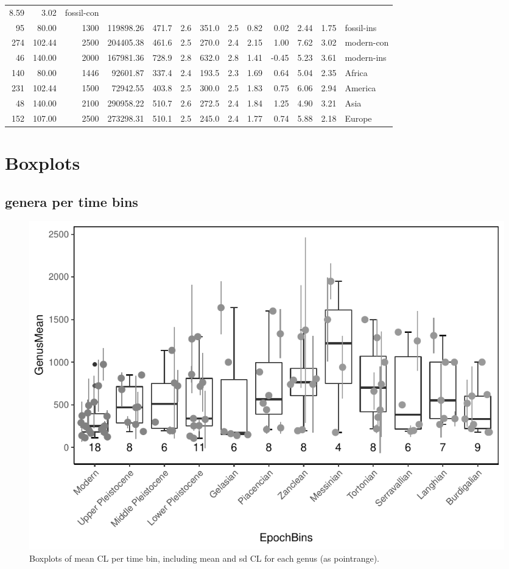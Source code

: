 \documentclass[]{article}
\begin{document}
\begin{longtable}[]{@{}rrrrrrrrrrrrl@{}}
8.59 & 3.02 & fossil-con\tabularnewline
95 & 80.00 & 1300 & 119898.26 & 471.7 & 2.6 & 351.0 & 2.5 & 0.82 & 0.02
& 2.44 & 1.75 & fossil-ins\tabularnewline
274 & 102.44 & 2500 & 204405.38 & 461.6 & 2.5 & 270.0 & 2.4 & 2.15 &
1.00 & 7.62 & 3.02 & modern-con\tabularnewline
46 & 140.00 & 2000 & 167981.36 & 728.9 & 2.8 & 632.0 & 2.8 & 1.41 &
-0.45 & 5.23 & 3.61 & modern-ins\tabularnewline
140 & 80.00 & 1446 & 92601.87 & 337.4 & 2.4 & 193.5 & 2.3 & 1.69 & 0.64
& 5.04 & 2.35 & Africa\tabularnewline
231 & 102.44 & 1500 & 72942.55 & 403.8 & 2.5 & 300.0 & 2.5 & 1.83 & 0.75
& 6.06 & 2.94 & America\tabularnewline
48 & 140.00 & 2100 & 290958.22 & 510.7 & 2.6 & 272.5 & 2.4 & 1.84 & 1.25
& 4.90 & 3.21 & Asia\tabularnewline
152 & 107.00 & 2500 & 273298.31 & 510.1 & 2.5 & 245.0 & 2.4 & 1.77 &
0.74 & 5.88 & 2.18 & Europe\tabularnewline
\bottomrule
\end{longtable}

\newpage

\section{Boxplots}\label{boxplots}

\subsection{genera per time bins}\label{genera-per-time-bins}

\begin{figure}[htbp]
\centering
\includegraphics{MA_JJ_files/figure-latex/Boxplots of each genus per time bin-1.pdf}
\caption{Boxplots of mean CL per time bin, including mean and sd CL for
each genus (as pointrange).}
\end{figure}
\end{document}
